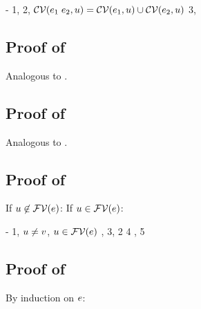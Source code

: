 \begin{derivation}
\step{\esbsokO{\appO}}
     {\hyp}
\step{\efvar{\exprI}\cap\cvarvO{\appO}=\emptyset}
     {1, }
     {2, $\mathcal{CV}(e_1\;e_2,u)=\mathcal{CV}(e_1,u)\cup\mathcal{CV}(e_2,u)$}
     {3, }
\end{derivation}



\subsection*{Proof of }

Analogous to .



\subsection*{Proof of }

Analogous to .



\subsection*{Proof of }

If $u\not\in\mathcal{FV}(e)$:
\StepO{\esbsokO{\expr}}
      {}
If $u\in\mathcal{FV}(e)$:
\begin{derivation}
\step{\esbsokO{\absO}}
     {\hyp}
\step{\efvar{\exprI}\cap\cvarvO{\absO}=\emptyset}
     {1, }
\step{\varI\in\efvar{\expr}-\setI{\var}}
     {$u\neq v$, $u\in\mathcal{FV}(e)$}
\step{\efvar{\exprI}\cap(\setI{\var}\cup\cvarvO{\expr})=\emptyset}
     {, 3, 2}
\step{\efvar{\expr}\cap\cvarvO{\expr}=\emptyset}
     {4}
\step{\esbsokO{\expr}}
     {, 5}
\end{derivation}



\subsection*{Proof of }

By induction on $e$:

